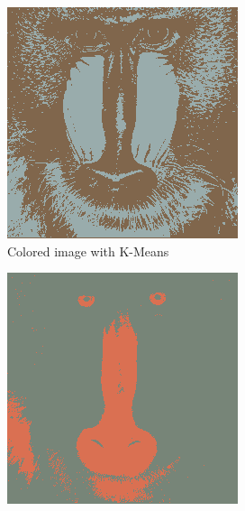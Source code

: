 \documentclass[sigconf,authorversion]{acmart}
\begin{document}
\begin{figure}[hbtp]
  \begin{subfigure}[b]{0.25\textwidth}
      \includegraphics[width=\textwidth]{../outputs/baboon_2_rgb_colored_kmeans.png}
      \caption{Colored image with K-Means}
      \label{subfig:baboon_rgb_kmeans}
  \end{subfigure}
  \hspace{0.05\textwidth}
  \begin{subfigure}[b]{0.25\textwidth}
      \includegraphics[width=\textwidth]{../outputs/baboon_2_rgb_colored_gmm.png}

\end{subfigure}
\end{figure}
\end{document}
